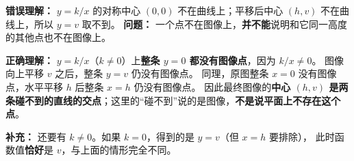 \begin{trapbox}
    \textbf{错误理解：} $y=k/x$ 的对称中心 $(0,0)$ 不在曲线上；平移后中心 $(h,v)$ 不在曲线上，所以 $y=v$ 取不到。
    \textbf{问题：} 一个点不在图像上，\textbf{并不能}说明和它同一高度的其他点也不在图像上。

    \textbf{正确理解：} $y=k/x$（$k\ne0$）上\textbf{整条 $y=0$ 都没有图像点}，因为 $k/x\ne0$。
    图像向上平移 $v$ 之后，整条 $y=v$ 仍没有图像点。
    同理，原图整条 $x=0$ 没有图像点，水平平移 $h$ 后整条 $x=h$ 仍没有图像点。
    因此最终图像的\textbf{中心 $(h,v)$ 是两条碰不到的直线的交点}；这里的“碰不到”说的是图像，\textbf{不是说平面上不存在这个点}。

    \textbf{补充：} 还要有 $k\ne0$。如果 $k=0$，得到的是 $y=v$（但 $x=h$ 要排除），
    此时函数值\textbf{恰好}是 $v$，与上面的情形完全不同。
\end{trapbox}
